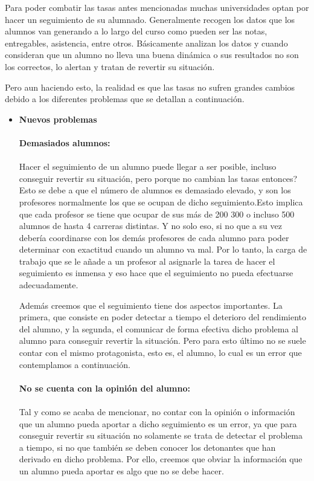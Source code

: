 Para poder combatir las tasas antes mencionadas muchas universidades optan por hacer un seguimiento de su alumnado. Generalmente recogen los datos que los alumnos van generando a lo largo del curso como pueden ser las notas, entregables, asistencia, entre otros. Básicamente analizan los datos y cuando consideran que un alumno no lleva una buena dinámica o sus resultados no son los correctos, lo alertan y tratan de revertir su situación.

Pero aun haciendo esto, la realidad es que las tasas no sufren grandes cambios debido a los diferentes problemas que se detallan a continuación.
\begin{itemize}
\item{\textbf{Nuevos problemas}}
\paragraph{}
\textbf{Demasiados alumnos:}
\paragraph{}
Hacer el seguimiento de un alumno puede llegar a ser posible, incluso conseguir revertir su situación, pero porque no cambian las tasas entonces? Esto se debe a que el número de alumnos es demasiado elevado, y son los profesores normalmente los que se ocupan de dicho seguimiento.Esto implica que cada profesor se tiene que ocupar de sus más de 200 300 o incluso 500 alumnos de hasta 4 carreras distintas. Y no solo eso, si no que a su vez debería coordinarse con los demás profesores de cada alumno para poder determinar con exactitud cuando un alumno va mal. Por lo tanto, la carga de trabajo que se le añade a un profesor al asignarle la tarea de hacer el seguimiento es inmensa y eso hace que el seguimiento no pueda efectuarse adecuadamente.

Además creemos que el seguimiento tiene dos aspectos importantes. La primera, que consiste en poder detectar a tiempo el deterioro del rendimiento del alumno, y la segunda, el comunicar de forma efectiva dicho problema al alumno para conseguir revertir la situación. Pero para esto último no se suele contar con el mismo protagonista, esto es, el alumno, lo cual es un error que contemplamos a continuación.
\paragraph{}
\textbf{No se cuenta con la opinión del alumno:}
\paragraph{}
Tal y como se acaba de mencionar, no contar con la opinión o información que un alumno pueda aportar a dicho seguimiento es un error, ya que para conseguir revertir su situación no solamente se trata de detectar el problema a tiempo, si no que también se deben conocer los detonantes que han derivado en dicho problema. Por ello, creemos que obviar la información que un alumno pueda aportar es algo que no se debe hacer.
\end{itemize}

